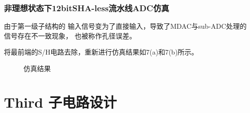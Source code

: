 \documentclass[10pt, mathserif]{beamer}	%
\newcommand{\ftitle}[1]{\frametitle{#1}}	%
\begin{document}
	\begin{frame}
		\ftitle{非理想状态下12bitSHA-less流水线ADC仿真}
		由于第一级子结构的
    	输入信号变为了直接输入，导致了MDAC与sub-ADC处理的信号存在不一致现象，
    	也被称作孔径误差。
		\par 将最前端的S/H电路去除，重新进行仿真结果如7(a)和7(b)所示。
		\begin{figure}[H]
			\centering
			\centering
			\caption{仿真结果}
		\end{figure}

	\end{frame}

\section{Third 子电路设计}
\end{document}
